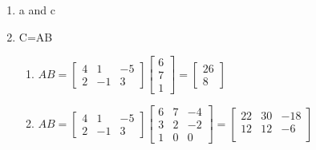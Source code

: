 \begin{SaveQuestion}
    \begin{enumerate}
        \item a and c
        \item C=AB \\
        \begin{enumerate}
            \item  $AB= \begin{bmatrix} 4 & 1 & -5 \\
			2 & -1 & 3\end{bmatrix}
            \begin{bmatrix} 6 \\ 7\\1  \end{bmatrix} =
            \begin{bmatrix}
            26 \\ 8
            \end{bmatrix}
            $ 

            \item $AB= \begin{bmatrix} 4 & 1 & -5 \\
			2 & -1 & 3\end{bmatrix} \begin{bmatrix} 6 & 7 & -4 \\ 3 & 2 &  -2\\1&0&0\end{bmatrix}=
            \begin{bmatrix}
                22 & 30 & -18 \\
                12 & 12 & -6 \\
            \end{bmatrix}$ 
        \end{enumerate}
    \end{enumerate}
\end{SaveQuestion}


 



